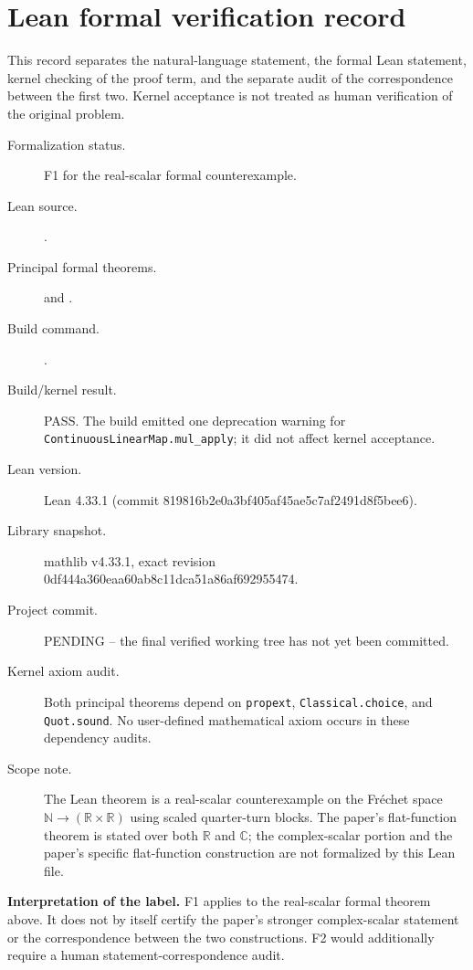 \documentclass[11pt]{article}
\theoremstyle{remark}
\begin{document}
\section*{Lean formal verification record}

\begingroup\small\sloppy
This record separates the natural-language statement, the formal Lean statement, kernel checking of the proof term, and the separate audit of the correspondence between the first two. Kernel acceptance is not treated as human verification of the original problem.

\begin{description}
\item[Formalization status.] F1 for the real-scalar formal counterexample.
\item[Lean source.] \texttt{}.
\item[Principal formal theorems.] \texttt{} and \texttt{}.
\item[Build command.] \texttt{}.
\item[Build/kernel result.] PASS. The build emitted one deprecation warning for \texttt{ContinuousLinearMap.mul\_apply}; it did not affect kernel acceptance.
\item[Lean version.] Lean 4.33.1 (commit 819816b2e0a3bf405af45ae5c7af2491d8f5bee6).
\item[Library snapshot.] mathlib v4.33.1, exact revision 0df444a360eaa60ab8c11dca51a86af692955474.
\item[Project commit.] PENDING -- the final verified working tree has not yet been committed.
\item[Kernel axiom audit.] Both principal theorems depend on \texttt{propext}, \texttt{Classical.choice}, and \texttt{Quot.sound}. No user-defined mathematical axiom occurs in these dependency audits.
\item[Scope note.] The Lean theorem is a real-scalar counterexample on the Fr\'echet space $\mathbb N\to(\mathbb R\times\mathbb R)$ using scaled quarter-turn blocks. The paper's flat-function theorem is stated over both $\mathbb R$ and $\mathbb C$; the complex-scalar portion and the paper's specific flat-function construction are not formalized by this Lean file.
\end{description}

\noindent\textbf{Interpretation of the label.} F1 applies to the real-scalar formal theorem above. It does not by itself certify the paper's stronger complex-scalar statement or the correspondence between the two constructions. F2 would additionally require a human statement-correspondence audit.
\endgroup
\end{document}
